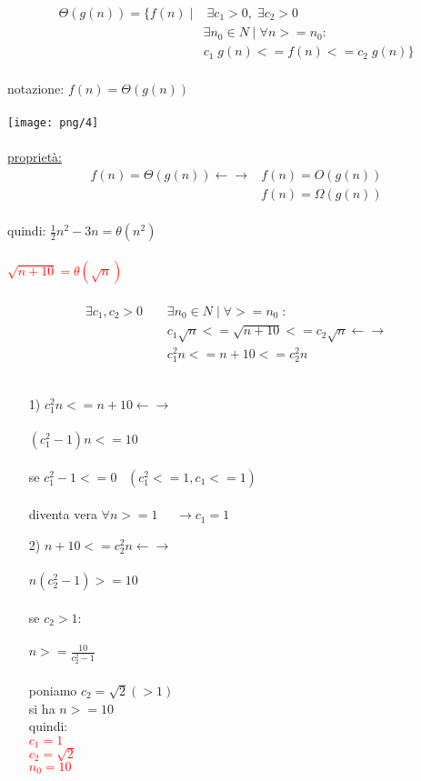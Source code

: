 \documentclass[12pt, letterpaper]{article}
\begin{document}
\[\begin{split}
   \Theta (g(n)) = \{f(n)\;|&\; \exists c_1 > 0,\; \exists c_2 > 0 \\
   & \exists n_0 \in N \; | \; \forall n >= n_0 :\\
   & c_1\;g(n) <= f(n) <= c_2 \; g(n)\}
\end{split}\]
\\
notazione: $f(n) = \Theta(g(n))$
\\
\\
\texttt{[image: png/4]}
\\
\\
\underline{proprietà:}
\[\begin{split}
   f(n) = \Theta(g(n)) \leftarrow\rightarrow &f(n) = O(g(n)) \\
   & f(n) = \Omega(g(n))
\end{split}\]
\\
quindi: $\frac{1}{2}n^2 - 3n = \theta(n^2)$
\\
\\
\textcolor{red}{$\sqrt{n+10} = \theta(\sqrt{n})$}\\
\\
\[\begin{split}
   \exists c_1,c_2 > 0 \;\;\;\; &\exists n_0 \in N \;|\; \forall >= n_0 \;:\\  
   & c_1\sqrt{n} <= \sqrt{n+10} <= c_2\sqrt{n} \leftarrow\rightarrow \\
   & c_1^2n <= n+10 <= c_2^2n
\end{split}\]
\\
\begin{itemize}
   \item[1)] $c_1^2 n <= n+10 \leftarrow\rightarrow$
      \\\\
      $(c_1^2 - 1) n <= 10$
      \\\\
      se $c_1^2 - 1 <= 0 \;\;\;(c_1^2 <= 1, c_1 <= 1)$
      \\\\
      diventa vera $\forall n >= 1 \;\;\;\;\;\rightarrow c_1 = 1$ 
   \item[2)] $n + 10 <= c_2^2n \leftarrow\rightarrow$
      \\
      \\
      $n(c_2^2 - 1) >= 10$
      \\
      \\
      se $c_2 > 1 :$
      \\
      \\
      $n >= \frac{10}{c_2^2 - 1}$
      \\
      \\
      poniamo $c_2 = \sqrt{2} (> 1)$
      \\
      si ha $n >= 10$
      \\
      quindi: \\
      \textcolor{red}{$c_1 = 1$}
      \\
      \textcolor{red}{$c_2 = \sqrt{2}$}
      \\
      \textcolor{red}{$n_0 = 10$}
\end{itemize}
\end{document}
